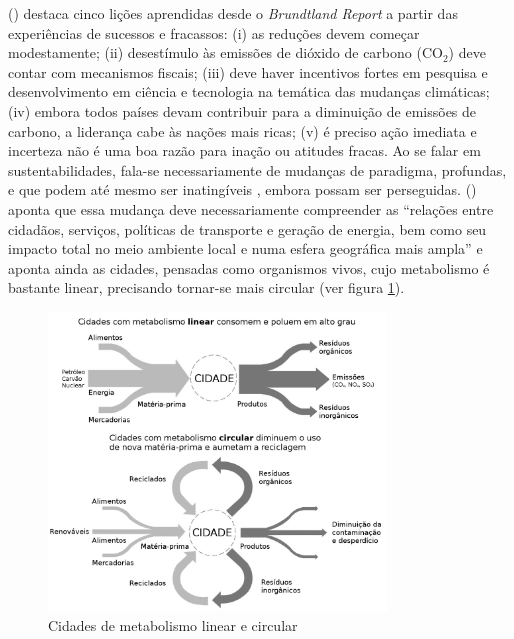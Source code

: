  (\citeyear{BANISTER2005}) destaca cinco lições aprendidas desde o \emph{Brundtland Report} a partir das experiências de sucessos e fracassos: (i) as reduções devem começar modestamente; (ii) desestímulo às emissões de dióxido de carbono (CO$_2$) deve contar com mecanismos fiscais; (iii) deve haver incentivos fortes em pesquisa e desenvolvimento em ciência e tecnologia na temática das mudanças climáticas; (iv) embora todos países devam contribuir para a diminuição de emissões de carbono, a liderança cabe às nações mais ricas; (v) é preciso ação imediata e incerteza não é uma boa razão para inação ou atitudes fracas.
Ao se falar em sustentabilidades, fala-se necessariamente de mudanças de paradigma, profundas, e que podem até mesmo ser inatingíveis \cite{GLASBY2002}, embora possam ser perseguidas.  (\citeyear{ROGERS2000}) aponta que essa mudança deve necessariamente compreender as ``relações entre cidadãos, serviços, políticas de transporte e geração de energia, bem como seu impacto total no meio ambiente local e numa esfera geográfica mais ampla'' e aponta ainda as cidades, pensadas como organismos vivos, cujo metabolismo é bastante linear, precisando tornar-se mais circular (ver figura \ref{fig:cidade-metabolismos}).

\begin{figure}[htb]%
    \caption{\label{fig:cidade-metabolismos}Cidades de metabolismo linear e circular}%
    \begin{center}%
        \includegraphics[width=0.80\textwidth]{./imagens/richard-linear-circular.jpg}%
    \end{center}%
\end{figure}%

